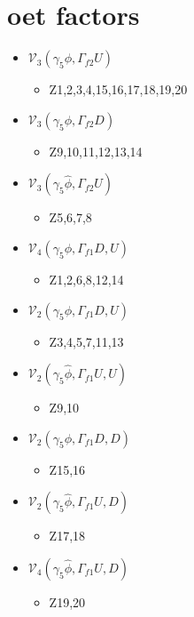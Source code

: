 \documentclass{article}[12pt]
\begin{document}
\section{oet factors}
\begin{itemize}
\item ${\mathcal V}_3\left(\gamma_5\phi,\Gamma_{f2} U\right)$
\begin{itemize}
\item Z1,2,3,4,15,16,17,18,19,20
\end{itemize}
\item ${\mathcal V}_3\left(\gamma_5\phi,\Gamma_{f2} D\right)$
\begin{itemize}
\item Z9,10,11,12,13,14
\end{itemize}
\item ${\mathcal V}_3\left(\gamma_5{\hat \phi},\Gamma_{f2} U\right)$
\begin{itemize}
\item Z5,6,7,8
\end{itemize}
\item ${\mathcal V}_4\left(\gamma_5\phi,\Gamma_{f1} D, U  \right)$
\begin{itemize}
\item Z1,2,6,8,12,14
\end{itemize}
\item ${\mathcal V}_2\left(\gamma_5\phi,\Gamma_{f1} D, U  \right)$
\begin{itemize}
\item Z3,4,5,7,11,13
\end{itemize}
\item ${\mathcal V}_2\left(\gamma_5{\hat \phi},\Gamma_{f1} U, U  \right)$
\begin{itemize}
\item Z9,10
\end{itemize}
\item ${\mathcal V}_2\left(\gamma_5\phi,\Gamma_{f1} D, D  \right)$
\begin{itemize}
\item Z15,16
\end{itemize}
\item ${\mathcal V}_2\left(\gamma_5{\hat \phi},\Gamma_{f1} U, D  \right)$
\begin{itemize}
\item Z17,18
\end{itemize}
\item ${\mathcal V}_4\left(\gamma_5{\hat \phi},\Gamma_{f1} U, D  \right)$
\begin{itemize}
\item Z19,20
\end{itemize}




\end{itemize}
\end{document}
